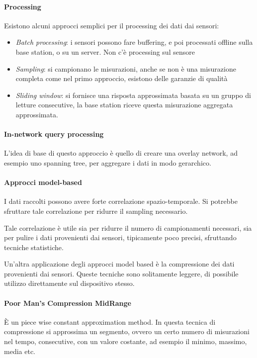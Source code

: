 \paragraph{Processing}
Esistono alcuni approcci semplici per il processing dei dati dai sensori:
\begin{itemize}
    \item \emph{Batch processing}: i sensori possono fare buffering, e poi processati offline sulla base station, 
    o su un server.
    Non c'è processing sul sensore
    \item \emph{Sampling}: si campionano le misurazioni, anche se non 
    è una misurazione completa come nel primo approccio, esistono delle garanzie 
    di qualità
    \item \emph{Sliding window}: si fornisce una risposta approssimata 
    basata su un gruppo di letture consecutive, la base station 
    riceve questa misurazione aggregata approssimata.
\end{itemize}

\paragraph{In-network query processing}
L'idea di base di questo approccio è quello 
di creare una overlay network, ad esempio uno spanning tree, 
per aggregare i dati in modo gerarchico.

\paragraph{Approcci model-based}
I dati raccolti possono avere forte correlazione spazio-temporale.
Si potrebbe sfruttare tale correlazione per ridurre il sampling necessario.

Tale correlazione è utile sia per ridurre il numero di campionamenti 
necessari, sia per pulire i dati provenienti dai sensori, tipicamente 
poco precisi, sfruttando tecniche statistiche.

Un'altra applicazione degli approcci model based è la compressione dei dati 
provenienti dai sensori.
Queste tecniche sono solitamente leggere, di possibile utilizzo direttamente 
sul dispositivo stesso.

\paragraph{Poor Man's Compression MidRange}
È un piece wise constant approximation method.
In questa tecnica di compressione si approssima un segmento, 
ovvero un certo numero di misurazioni nel tempo, consecutive, 
con un valore costante, ad esempio il minimo, massimo, media etc.

